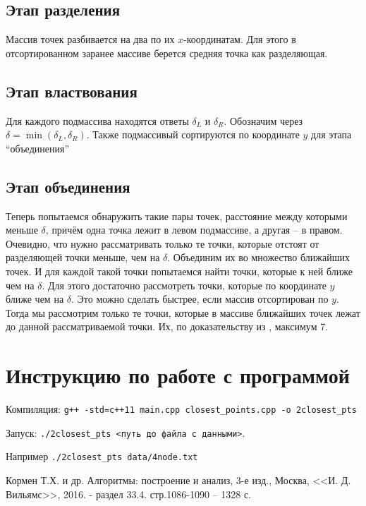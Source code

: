 \documentclass[12pt, a4paper]{article}
\begin{document}
        \subsection{Этап разделения}
            Массив точек разбивается на два по их $x$-координатам. Для этого в отсортированном заранее массиве берется средняя точка как разделяющая.

        \subsection{Этап властвования}
            Для каждого подмассива находятся ответы $\delta_L$ и $\delta_R$. Обозначим через $\delta = \min(\delta_L, \delta_R)$. Также подмассивый сортируются по координате $y$ для этапа ``объединения''

        \subsection{Этап объединения}
            Теперь попытаемся обнаружить такие пары точек, расстояние между которыми меньше $\delta$, причём одна точка лежит в левом подмассиве, а другая -- в правом. Очевидно, что нужно рассматривать только те точки, которые отстоят от разделяющей точки меньше, чем на $\delta$. Объединим их во множество ближайших точек. И для каждой такой точки попытаемся найти точки, которые к ней ближе чем на $\delta$. Для этого достаточно рассмотреть точки, которые по координате $y$ ближе чем на $\delta$. Это можно сделать быстрее, если массив отсортирован по $y$. Тогда мы рассмотрим только те точки, которые в массиве ближайших точек лежат до данной рассматриваемой точки. Их, по доказательству из \cite{clrs}, максимум 7.

    \section{Инструкцию по работе с программой}
        Компиляция: \verb|g++ -std=c++11 main.cpp closest_points.cpp -o 2closest_pts|

        Запуск: \verb|./2closest_pts <путь до файла с данными>|.

        \quad Например \verb|./2closest_pts data/4node.txt|


    \begin{thebibliography}{9}
        Кормен Т.Х. и др. Алгоритмы: построение и анализ, 3-е изд., Москва, <<И. Д. Вильямс>>, 2016. - раздел 33.4. стр.1086-1090 -- 1328 с.
    \end{thebibliography}
\end{document}
